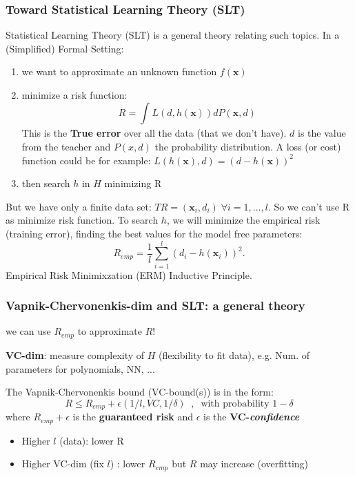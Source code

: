 \documentclass[../main.tex]{subfiles}
\begin{document}
\subsubsection{Toward Statistical Learning Theory (SLT)}
Statistical Learning Theory (SLT) is a general theory relating such topics. In a (Simplified) Formal Setting:
\begin{enumerate}
    \item we want to approximate an unknown function $f(\mathbf{x})$
    
    \item  minimize a risk function:
    $$  R = \int_{}^{} L(d, h(\mathbf{x}))dP(\mathbf{x},d)$$
    This is the \textbf{True error} over all the data (that we don't have). $d$ is the value from the teacher and $P(x,d)$ the probability distribution. A loss (or cost) function could be for example: $L(h(\mathbf{x}),d) = (d - h(\mathbf{x}))^2$
    
    \item then search $h$ in $H$ minimizing R
\end{enumerate}
But we have only a finite data set: $TR = (\mathbf{x}_i,d_i) \; \forall i = 1, \dots, l$. So we can't use R as minimize risk function. To search $h$, we will minimize the empirical risk (training error), finding the best values for the model free parameters:
\[
    R_{emp} = \frac{1}{l} \sum_{i = 1}^{l}(d_i - h(\mathbf{x}_i))^2
.\] 
Empirical Risk Minimixzation (ERM) Inductive Principle.

\subsubsection*{Vapnik-Chervonenkis-dim and SLT: a general theory}%
we can use $R_{emp}$ to approximate $R$!

\textbf{VC-dim}: measure complexity of $H$ (flexibility to fit data), e.g. Num. of parameters for polynomials, NN, ...

The Vapnik-Chervonenkis bound (VC-bound(s)) is in the form:
$$ R \leq R_{emp} + \epsilon(1/l, VC, 1/\delta)\;\; , \;\; \text{with probability } 1 - \delta$$
where $R_{emp} + \epsilon$ is the \textbf{guaranteed risk} and $\epsilon$ is the \textbf{VC-\textit{confidence}} 
\begin{itemize}
    \item Higher $l$ (data): lower R 
    \item Higher VC-dim (fix $l$) : lower $R_{emp}$ but $R$ may increase (overfitting)
\end{itemize}
\end{document}
